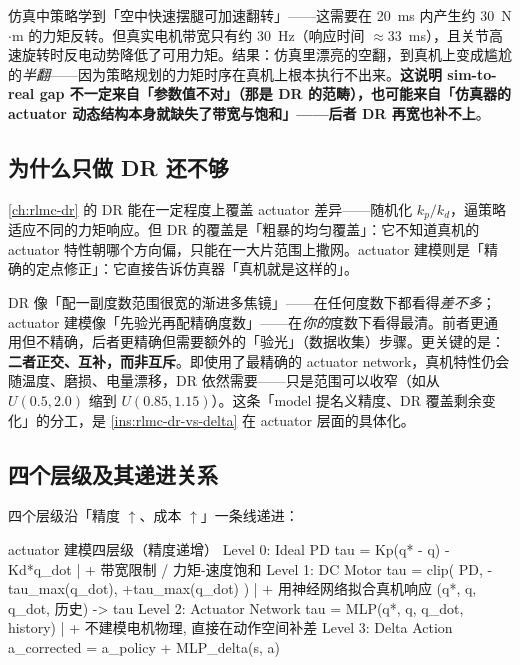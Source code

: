 \begin{insight}[一个具体的「半翻」失败]\label{ins:rlmc-act-halfflip}
仿真中策略学到「空中快速摆腿可加速翻转」——这需要在 20~ms 内产生约 30~N$\cdot$m 的力矩反转。但真实电机带宽只有约 30~Hz（响应时间 $\approx 33$~ms），且关节高速旋转时反电动势降低了可用力矩。结果：仿真里漂亮的空翻，到真机上变成尴尬的\emph{半翻}——因为策略规划的力矩时序在真机上根本执行不出来。\textbf{这说明 sim-to-real gap 不一定来自「参数值不对」（那是 DR 的范畴），也可能来自「仿真器的 actuator 动态结构本身就缺失了带宽与饱和」——后者 DR 再宽也补不上}。
\end{insight}

\subsection{为什么只做 DR 还不够}
\label{sec:rlmc-act-vs-dr}

\cref{ch:rlmc-dr} 的 DR 能在一定程度上覆盖 actuator 差异——随机化 $k_p/k_d$，逼策略适应不同的力矩响应。但 DR 的覆盖是「粗暴的均匀覆盖」：它不知道真机的 actuator 特性朝哪个方向偏，只能在一大片范围上撒网。actuator 建模则是「精确的定点修正」：它直接告诉仿真器「真机就是这样的」。

\begin{insight}\label{ins:rlmc-act-glasses}
DR 像「配一副度数范围很宽的渐进多焦镜」——在任何度数下都看得\emph{差不多}；actuator 建模像「先验光再配精确度数」——在\emph{你的}度数下看得最清。前者更通用但不精确，后者更精确但需要额外的「验光」（数据收集）步骤。更关键的是：\textbf{二者正交、互补，而非互斥}。即使用了最精确的 actuator network，真机特性仍会随温度、磨损、电量漂移，DR 依然需要——只是范围可以收窄（如从 $U(0.5,2.0)$ 缩到 $U(0.85,1.15)$）。这条「model 提名义精度、DR 覆盖剩余变化」的分工，是 \cref{ins:rlmc-dr-vs-delta} 在 actuator 层面的具体化。
\end{insight}

\subsection{四个层级及其递进关系}
\label{sec:rlmc-act-fourlevels}

四个层级沿「精度 $\uparrow$、成本 $\uparrow$」一条线递进：

\begin{codebox}{actuator 建模四层级（精度递增）}
Level 0: Ideal PD          tau = Kp(q* - q) - Kd*q_dot
   |  + 带宽限制 / 力矩-速度饱和
Level 1: DC Motor          tau = clip( PD,  -tau_max(q_dot), +tau_max(q_dot) )
   |  + 用神经网络拟合真机响应 (q*, q, q_dot, 历史) -> tau
Level 2: Actuator Network  tau = MLP(q*, q, q_dot, history)
   |  + 不建模电机物理, 直接在动作空间补差
Level 3: Delta Action      a_corrected = a_policy + MLP_delta(s, a)
\end{codebox}

